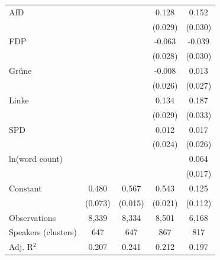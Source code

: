 \begin{table}[htbp]
\begin{tabular}{l*{4}{c}}
AfD                 &                     &                     &       0.128\sym{***}&       0.152\sym{***}\\
                    &                     &                     &     (0.029)         &     (0.030)         \\
\addlinespace
FDP                 &                     &                     &      -0.063\sym{**} &      -0.039         \\
                    &                     &                     &     (0.028)         &     (0.030)         \\
\addlinespace
Grüne               &                     &                     &      -0.008         &       0.013         \\
                    &                     &                     &     (0.026)         &     (0.027)         \\
\addlinespace
Linke               &                     &                     &       0.134\sym{***}&       0.187\sym{***}\\
                    &                     &                     &     (0.029)         &     (0.033)         \\
\addlinespace
SPD                 &                     &                     &       0.012         &       0.017         \\
                    &                     &                     &     (0.024)         &     (0.026)         \\
\addlinespace
ln(word count)      &                     &                     &                     &       0.064\sym{***}\\
                    &                     &                     &                     &     (0.017)         \\
\addlinespace
Constant            &       0.480\sym{***}&       0.567\sym{***}&       0.543\sym{***}&       0.125         \\
                    &     (0.073)         &     (0.015)         &     (0.021)         &     (0.112)         \\
\midrule
Observations        &       8,339         &       8,334         &       8,501         &       6,168         \\
Speakers (clusters) &         647         &         647         &         867         &         817         \\
Adj. R$^2$          &       0.207         &       0.241         &       0.212         &       0.197         \\

\end{tabular}
\end{table}
